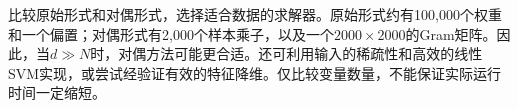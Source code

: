 比较原始形式和对偶形式，选择适合数据的求解器。原始形式约有100,000个权重和一个偏置；对偶形式有2,000个样本乘子，以及一个\(2000\times2000\)的Gram矩阵。因此，当\(d\gg N\)时，对偶方法可能更合适。还可利用输入的稀疏性和高效的线性SVM实现，或尝试经验证有效的特征降维。仅比较变量数量，不能保证实际运行时间一定缩短。
